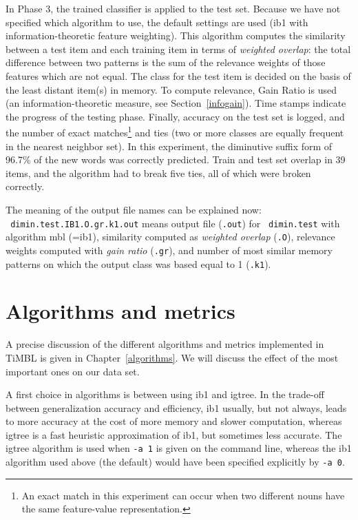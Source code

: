 \documentclass{report}
\begin{document}
In Phase 3, the trained classifier is applied to the test set. Because
we have not specified which algorithm to use, the default settings are
used ({\sc ib1} with information-theoretic feature weighting). This
algorithm computes the similarity between a test item and each
training item in terms of {\em weighted overlap}: the total difference
between two patterns is the sum of the relevance weights of those
features which are not equal. The class for the test item is decided
on the basis of the least distant item(s) in memory. To compute
relevance, Gain Ratio is used (an information-theoretic measure, see
Section~\ref{infogain}). Time stamps indicate the progress of the
testing phase. Finally, accuracy on the test set is logged, and the
number of exact matches\footnote{An exact match in this experiment can
  occur when two different nouns have the same feature-value
  representation.} and ties (two or more classes are equally frequent
in the nearest neighbor set). In this experiment, the diminutive
suffix form of 96.7\% of the new words was correctly predicted. Train
and test set overlap in 39 items, and the algorithm had to break five
ties, all of which were broken correctly.

The meaning of the output file names can be explained now:\\ {\tt
dimin.test.IB1.O.gr.k1.out} means output file ({\tt .out}) for {\tt
dimin.test} with algorithm {\sc mbl} (={\sc ib1}), similarity computed
as {\em weighted overlap} ({\tt .O}), relevance weights computed with
{\em gain ratio} ({\tt .gr}), and number of most similar memory
patterns on which the output class was based equal to 1 ({\tt .k1}).

\section{Algorithms and metrics}

A precise discussion of the different algorithms and metrics
implemented in TiMBL is given in Chapter~\ref{algorithms}. We will
discuss the effect of the most important ones on our data set.

A first choice in algorithms is between using {\sc ib1} and {\sc
igtree}. In the trade-off between generalization accuracy and
efficiency, {\sc ib1} usually, but not always, leads to more accuracy
at the cost of more memory and slower computation, whereas {\sc
igtree} is a fast heuristic approximation of {\sc ib1}, but sometimes
less accurate. The {\sc igtree} algorithm is used when {\tt -a 1} is
given on the command line, whereas the {\sc ib1} algorithm used above
(the default) would have been specified explicitly by {\tt -a 0}. 
\end{document}
